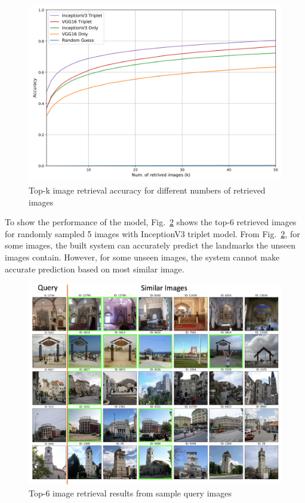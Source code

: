 \documentclass[final,3p]{elsarticle}
\begin{document}
\begin{figure}[h]
\centering\includegraphics[width=0.7\linewidth]{./figures/accuracy.png}
\caption{Top-k image retrieval accuracy for different numbers of retrieved images}
\label{fig:accuracy}
\end{figure}

To show the performance of the model, Fig.~\ref{fig:result} shows the top-6 retrieved images for randomly sampled 5 images with InceptionV3 triplet model. From Fig.~\ref{fig:result}, for some images, the built system can accurately predict the landmarks the unseen images contain. However, for some unseen images, the system cannot make accurate prediction based on most similar image.

\begin{figure}[h]
\centering\includegraphics[width=1.0\linewidth]{./figures/result.png}
\caption{Top-6 image retrieval results from sample query images}
\label{fig:result}
\end{figure}
\end{document}
